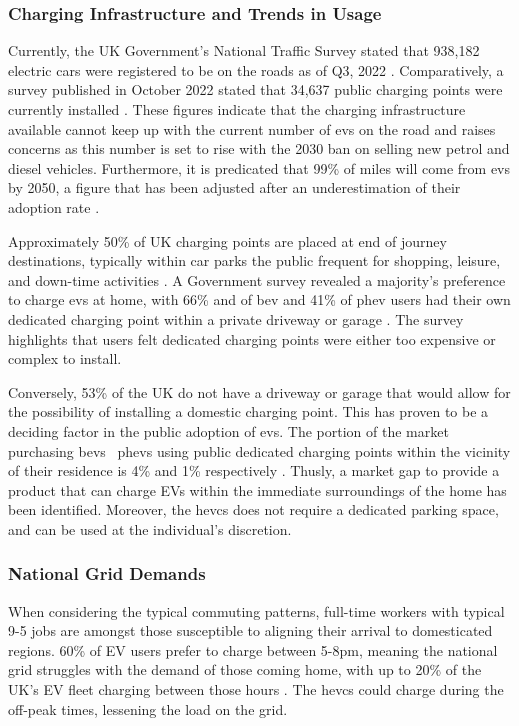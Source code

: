 \documentclass [12pt]{article}
\begin{document}
\subsubsection{Charging Infrastructure and Trends in Usage}

Currently, the UK Government’s National Traffic Survey stated that 938,182 electric cars were registered to be on the roads as of Q3, 2022 \cite{Q32022}. Comparatively, a survey published in October 2022 stated that 34,637 public charging points were currently installed \cite{chargestats}. These figures indicate that the charging infrastructure available cannot keep up with the current number of \gls{ev}s on the road and raises concerns as this number is set to rise with the 2030 ban on selling new petrol and diesel vehicles. Furthermore, it is predicated that 99\% of miles will come from \gls{ev}s by 2050, a figure that has been adjusted after an underestimation of their adoption rate \cite{2050rates}. 

Approximately 50\% of UK charging points are placed at end of journey destinations, typically within car parks the public frequent for shopping, leisure, and down-time activities \cite{chargestats}. A Government survey revealed a majority's preference to charge \gls{ev}s at home, with 66\% and of \gls{bev} and 41\% of \gls{phev} users had their own dedicated charging point within a private driveway or garage \cite{homecharge}. The survey highlights that users felt dedicated charging points were either too expensive or complex to install.

Conversely, 53\% of the UK do not have a driveway or garage that would allow for the possibility of installing a domestic charging point. This has proven to be a deciding factor in the public adoption of \gls{ev}s. The portion of the market purchasing \gls{bev}s \ \gls{phev}s using public dedicated charging points within the vicinity of their residence is 4\% and 1\% respectively \cite{chargestats}. Thusly, a market gap to provide a product that can charge EVs within the immediate surroundings of the home has been identified. Moreover, the \gls{hevcs} does not require a dedicated parking space, and can be used at the individual's discretion. 

\subsubsection{National Grid Demands}

When considering the typical commuting patterns, full-time workers with typical 9-5 jobs are amongst those susceptible to aligning their arrival to domesticated regions. 60\% of EV users prefer to charge between 5-8pm, meaning the national grid struggles with the demand of those coming home, with up to 20\% of the UK's EV fleet charging between those hours \cite{chargestats}. The \gls{hevcs} could charge during the off-peak times, lessening the load on the grid.
\end{document}
